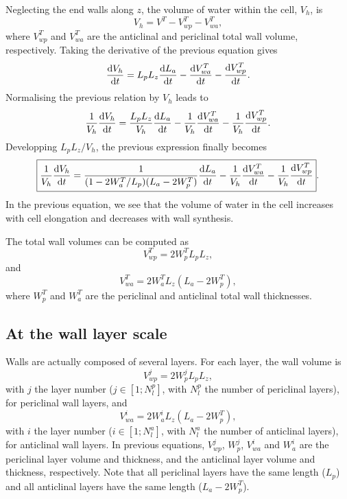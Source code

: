 \documentclass[]{article}
\begin{document}
Neglecting the end walls along $z$, the volume of water within the cell, $V_h$, is
\begin{equation}
	V_h = V^T - V_{wp}^T - V_{wa}^T,
\end{equation}
where $V_{wp}^T$ and $V_{wa}^T$ are the anticlinal and periclinal total wall volume, respectively. Taking the derivative of the previous equation gives
\begin{equation}
	\frac{{\rm d} V_h}{{\rm d} t}=L_pL_z\frac{{\rm d} L_a}{{\rm d} t} - \frac{{\rm d} V_{wa}^T}{{\rm d} t} - \frac{{\rm d} V_{wp}^T}{{\rm d} t}.
\end{equation}
Normalising the previous relation by $V_h$ leads to
\begin{equation}
	\frac{1}{V_h}\frac{{\rm d} V_h}{{\rm d} t}=\frac{L_pL_z}{V_h}\frac{{\rm d} L_a}{{\rm d} t} - \frac{1}{V_h}\frac{{\rm d} V_{wa}^T}{{\rm d} t} - \frac{1}{V_h}\frac{{\rm d} V_{wp}^T}{{\rm d} t}.
\end{equation}
Developping $L_pL_z/V_h $, the previous expression finally becomes
\begin{equation}\label{kinematic}
	\boxed{
	\frac{1}{V_h}\frac{{\rm d} V_h}{{\rm d} t}=\frac{1}{(1-2W_a^T/L_p)(L_a-2W_p^T)}\frac{{\rm d} L_a}{{\rm d} t} - \frac{1}{V_h}\frac{{\rm d} V_{wa}^T}{{\rm d} t} - \frac{1}{V_h}\frac{{\rm d} V_{wp}^T}{{\rm d} t}}.
\end{equation}
In the previous equation, we see that the volume of water in the cell increases with cell elongation and decreases with wall synthesis.

The total wall volumes can be computed as
\begin{equation}
	V_{wp}^T=2W_p^TL_pL_z,
\end{equation}
and
\begin{equation}
	V_{wa}^T=2W_a^TL_z(L_a-2W_p^T),
\end{equation}
where $W_p^T$ and $W_a^T$ are the periclinal and anticlinal total wall thicknesses.


\subsection{At the wall layer scale}
Walls are actually composed of several layers. For each layer, the wall volume is
\begin{equation}\label{periclinal_layer}
	V_{wp}^j=2W_p^jL_pL_z,
\end{equation}
with $j$ the layer number ($j \in [1;N_l^p]$, with $N_l^p$ the number of periclinal layers), for periclinal wall layers, and
\begin{equation}\label{anticlinal_layer}
	V_{wa}^i=2W_a^i L_z(L_a-2W_p^T),
\end{equation}
with $i$ the layer number ($i \in [1;N_l^a]$, with $N_l^a$ the number of anticlinal layers), for anticlinal wall layers. In previous equations, $V_{wp}^j$, $W_p^j$, $V_{wa}^i$ and $W_a^i$ are the periclinal layer volume and thickness, and the anticlinal layer volume and thickness, respectively. Note that all periclinal layers have the same length ($L_p$) and all anticlinal layers have the same length ($L_a-2W_p^T$).
\end{document}
